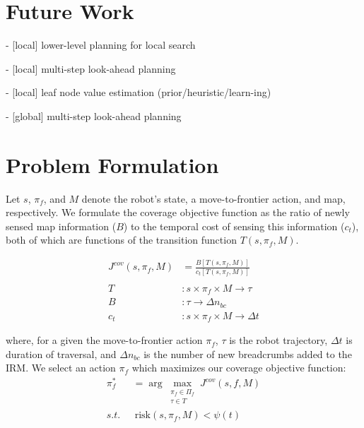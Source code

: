 \documentclass[letterpaper, 10 pt, conference]{ieeeconf}  %
\begin{document}
\section{Future Work}


- [local] lower-level planning for local search

- [local] multi-step look-ahead planning

- [local] leaf node value estimation (prior/heuristic/learn-ing)

- [global] multi-step look-ahead planning




\clearpage
\section{Problem Formulation}
Let $s$, $\pi_f$, and $M$ denote the robot's state, a move-to-frontier action, and map, respectively. We formulate the coverage objective function as the ratio of newly sensed map information ($B$) to the temporal cost of sensing this information ($c_t$), both of which are functions of the transition function $T(s,\pi_f,M)$.

\begin{align}
    J^{cov}(s,\pi_f,M) &= \frac{B[T(s,\pi_f,M)]}{c_t[T(s,\pi_f,M)]} \\ \nonumber \\ 
    T &\colon s \times \pi_f \times M\to \tau \nonumber \\
    B &\colon \tau\to \Delta n_{bc} \nonumber \\
    c_t &\colon s \times \pi_f \times M\to \Delta t \nonumber 
\end{align}

\noindent where, for a given the move-to-frontier action $\pi_f$, $\tau$ is the robot trajectory, $\Delta t$ is duration of traversal, and $\Delta n_{bc}$ is the number of new breadcrumbs added to the IRM. We select an action $\pi_f$ which maximizes our coverage objective function:
\begin{align}
    \pi_f^* &= \arg\max_{\substack{\pi_f\in \Pi_f \\ \tau \in T}} J^{cov}(s,f,M) \\
    s.t.~~&~\textrm{risk}(s,\pi_f,M)< \psi(t)
\end{align}
\end{document}
